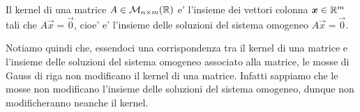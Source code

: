 \begin{remark}
    Il kernel di una matrice $A \in \mathcal{M}_{n \times m}(\mathbb{R})$ e' l'insieme dei vettori colonna $\bm{x} \in \mathbb{R}^m$ tali che $A\vec{x} = \vec{0}$, cioe' e' l'insieme delle soluzioni del sistema omogeneo $A\vec{x}= \vec{0}$.
\end{remark}

Notiamo quindi che, essendoci una corrispondenza tra il kernel di una matrice e l'insieme delle soluzioni del sistema omogeneo associato alla matrice, le mosse di Gauss di riga non modificano il kernel di una matrice. Infatti sappiamo che le mosse non modificano l'insieme delle soluzioni del sistema omogeneo, dunque non modificheranno neanche il kernel.